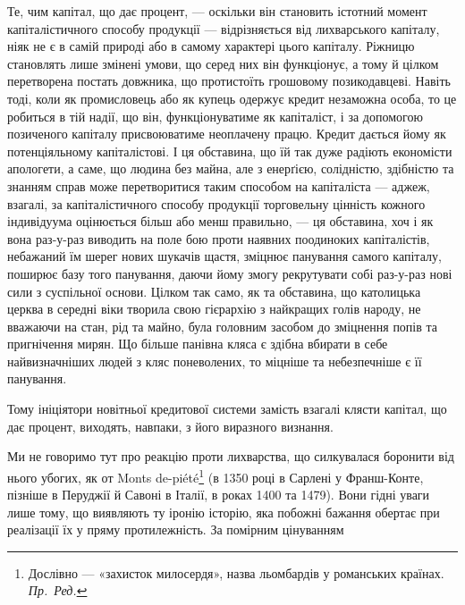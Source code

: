 Те, чим капітал, що дає процент, — оскільки він становить істотний момент
капіталістичного способу продукції — відрізняється від лихварського капіталу,
ніяк не є в самій природі або в самому характері цього капіталу. Ріжницю становлять
лише змінені умови, що серед них він функціонує, а тому й цілком
перетворена постать довжника, що протистоїть грошовому позикодавцеві. Навіть
тоді, коли як промисловець або як купець одержує кредит незаможна особа, то
це робиться в тій надії, що він, функціонуватиме як капіталіст, і за допомогою
позиченого капіталу присвоюватиме неоплачену працю. Кредит дається йому як
потенціяльному капіталістові. І ця обставина, що їй так дуже радіють економісти
апологети, а саме, що людина без майна, але з енерґією, солідністю, здібністю
та знанням справ може перетворитися таким способом на капіталіста — аджеж,
взагалі, за капіталістичного способу продукції торговельну цінність кожного
індивідуума оцінюється більш або менш правильно, — ця обставина, хоч і як
вона раз-у-раз виводить на поле бою проти наявних поодиноких капіталістів,
небажаний їм шерег нових шукачів щастя, зміцнює панування самого капіталу,
поширює базу того панування, даючи йому змогу рекрутувати собі раз-у-раз
нові сили з суспільної основи. Цілком так само, як та обставина, що католицька
церква в середні віки творила свою гієрархію з найкращих голів народу, не
вважаючи на стан, рід та майно, була головним засобом до зміцнення попів та
пригнічення мирян. Що більше панівна кляса є здібна вбирати в себе найвизначніших
людей з кляс поневолених, то міцніше та небезпечніше є її панування.

Тому ініціятори новітньої кредитової системи замість взагалі клясти капітал,
що дає процент, виходять, навпаки, з його виразного визнання.

Ми не говоримо тут про реакцію проти лихварства, що силкувалася боронити
від нього убогих, як от Monts de-piété\footnote*{
Дослівно — «захисток милосердя», назва льомбардів у романських країнах. \emph{Пр.~Ред.}
} (в 1350 році в Сарлені у Франш-Конте,
пізніше в Перуджії й Савоні в Італії, в роках 1400 та 1479). Вони
гідні уваги лише тому, що виявляють ту іронію історію, яка побожні бажання
обертає при реалізації їх у пряму протилежність. За помірним цінуванням
\parbreak{}  %

